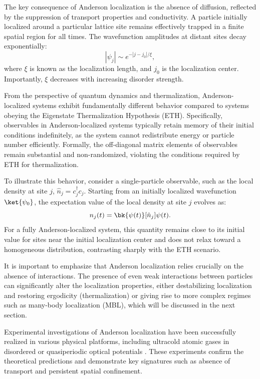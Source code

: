 The key consequence of Anderson localization is the absence of diffusion, reflected by the suppression of transport properties and conductivity. A particle initially localized around a particular lattice site remains effectively trapped in a finite spatial region for all times. The wavefunction amplitudes at distant sites decay exponentially:
\begin{equation}
|\psi_j| \sim e^{-|j-j_0|/\xi},
\end{equation}
where $\xi$ is known as the localization length, and $j_0$ is the localization center. Importantly, $\xi$ decreases with increasing disorder strength.

From the perspective of quantum dynamics and thermalization, Anderson-localized systems exhibit fundamentally different behavior compared to systems obeying the Eigenstate Thermalization Hypothesis (ETH). Specifically, observables in Anderson-localized systems typically retain memory of their initial conditions indefinitely, as the system cannot redistribute energy or particle number efficiently. Formally, the off-diagonal matrix elements of observables remain substantial and non-randomized, violating the conditions required by ETH for thermalization.

To illustrate this behavior, consider a single-particle observable, such as the local density at site $j$, $\hat{n}_j = c_j^\dagger c_j$. Starting from an initially localized wavefunction $\ket{\psi_0}$, the expectation value of the local density at site $j$ evolves as:
\begin{equation}
n_j(t) = \bk{\psi(t)}[\hat{n}_j]{\psi(t)}.
\end{equation}
For a fully Anderson-localized system, this quantity remains close to its initial value for sites near the initial localization center and does not relax toward a homogeneous distribution, contrasting sharply with the ETH scenario.

It is important to emphasize that Anderson localization relies crucially on the absence of interactions. The presence of even weak interactions between particles can significantly alter the localization properties, either destabilizing localization and restoring ergodicity (thermalization) or giving rise to more complex regimes such as many-body localization (MBL), which will be discussed in the next section.

Experimental investigations of Anderson localization have been successfully realized in various physical platforms, including ultracold atomic gases in disordered or quasiperiodic optical potentials \cite{billy_direct_2008, roati_anderson_2008}. These experiments confirm the theoretical predictions and demonstrate key signatures such as absence of transport and persistent spatial confinement.

